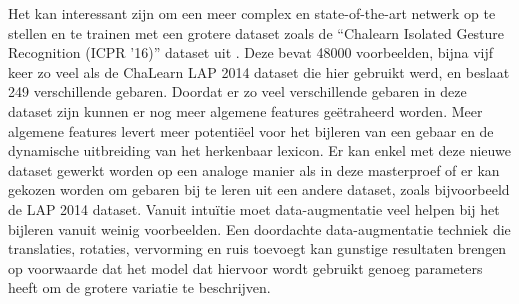 \npar Het kan interessant zijn om een meer complex en state-of-the-art netwerk op te stellen en te trainen met een grotere dataset zoals de ``Chalearn Isolated Gesture Recognition (ICPR '16)'' dataset uit \cite{wan_chalearn_2016}. Deze bevat 48000 voorbeelden, bijna vijf keer zo veel als de ChaLearn LAP 2014 dataset die hier gebruikt werd, en beslaat 249 verschillende gebaren. Doordat er zo veel verschillende gebaren in deze dataset zijn kunnen er nog meer algemene features ge\"etraheerd worden. Meer algemene features levert meer potenti\"eel voor het bijleren van een gebaar en de dynamische uitbreiding van het herkenbaar lexicon.
\npar Er kan enkel met deze nieuwe dataset gewerkt worden op een analoge manier als in deze masterproef of er kan gekozen worden om gebaren bij te leren uit een andere dataset, zoals bijvoorbeeld de LAP 2014 dataset.
\npar Vanuit intu\"itie moet data-augmentatie veel helpen bij het bijleren vanuit weinig voorbeelden. Een doordachte data-augmentatie techniek die translaties, rotaties, vervorming en ruis toevoegt kan gunstige resultaten brengen op voorwaarde dat het model dat hiervoor wordt gebruikt genoeg parameters heeft om de grotere variatie te beschrijven.